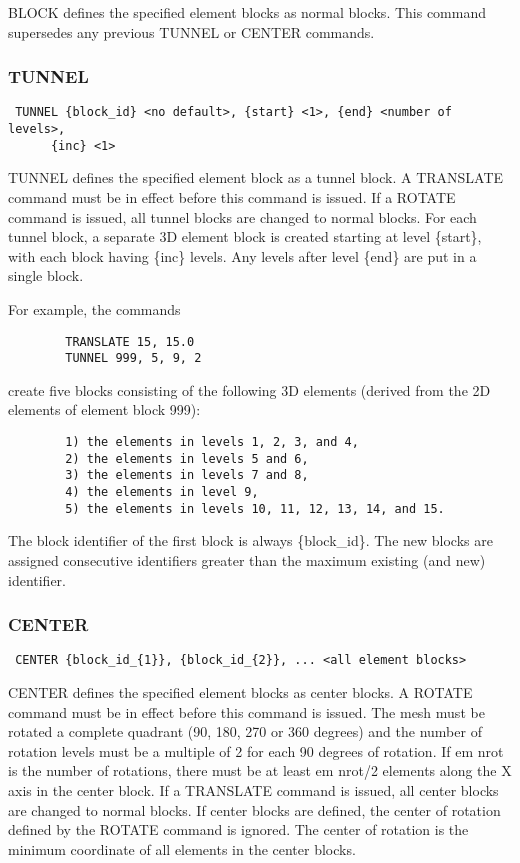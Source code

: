 BLOCK defines the specified element blocks as normal blocks.  This
command supersedes any previous TUNNEL or CENTER commands.
\subsubsection{TUNNEL}
\begin{verbatim}
 TUNNEL {block_id} <no default>, {start} <1>, {end} <number of levels>,
      {inc} <1>
\end{verbatim}

TUNNEL defines the specified element block as a tunnel block.  A
TRANSLATE command must be in effect before this command is issued.  If a
ROTATE command is issued, all tunnel blocks are changed to normal
blocks.
For each tunnel block, a separate 3D element block is created starting
at level \{start\}, with each block having \{inc\} levels.  Any levels after
level \{end\} are put in a single block.

For example, the commands

\begin{verbatim}
        TRANSLATE 15, 15.0
        TUNNEL 999, 5, 9, 2
\end{verbatim}

create five blocks consisting of the following 3D elements (derived from
the 2D elements of element block 999):

\begin{verbatim}
        1) the elements in levels 1, 2, 3, and 4,
        2) the elements in levels 5 and 6,
        3) the elements in levels 7 and 8,
        4) the elements in level 9,
        5) the elements in levels 10, 11, 12, 13, 14, and 15.
\end{verbatim}


The block identifier of the first block is always \{block\_id\}.  The new
blocks are assigned consecutive identifiers greater than the maximum
existing (and new) identifier.
\subsubsection{CENTER}
\begin{verbatim}
 CENTER {block_id_{1}}, {block_id_{2}}, ... <all element blocks> 
\end{verbatim}

CENTER defines the specified element blocks as center blocks.  A ROTATE
command must be in effect before this command is issued.  The mesh must
be rotated a complete quadrant (90, 180, 270 or 360 degrees) and the
number of rotation levels must be a multiple of 2 for each 90 degrees of
rotation.  If em nrot is the number of rotations, there must be at least
em nrot/2 elements along the X axis in the center block.  If a TRANSLATE
command is issued, all center blocks are changed to normal blocks.  If
center blocks are defined, the center of rotation defined by the ROTATE
command is ignored.  The center of rotation is the minimum coordinate of
all elements in the center blocks.  
